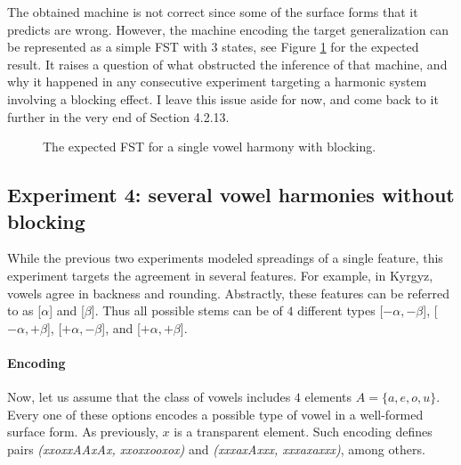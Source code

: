 The obtained machine is not correct since some of the surface forms that it predicts are wrong.
However, the machine encoding the target generalization can be represented as a simple FST with $3$ states, see Figure \ref{exp2fstrr} for the expected result.
It raises a question of what obstructed the inference of that machine, and why it happened in any consecutive experiment targeting a harmonic system involving a blocking effect.
I leave this issue aside for now, and come back to it further in the very end of Section 4.2.13.

\begin{figure}[h!] 
\centering
{}
\caption{The expected FST for a single vowel harmony with blocking.}
\label{exp2fstrr}
\end{figure}



\subsection{Experiment 4: several vowel harmonies without blocking}

While the previous two experiments modeled spreadings of a single feature, this experiment targets the agreement in several features.
For example, in Kyrgyz, vowels agree in backness and rounding.
Abstractly, these features can be referred to as [$\alpha$] and [$\beta$].
Thus all possible stems can be of $4$ different types [$-\alpha, -\beta$], [$-\alpha, +\beta$], [$+\alpha, -\beta$], and [$+\alpha, +\beta$].


\paragraph{Encoding}

Now, let us assume that the class of vowels includes $4$ elements $A = \{a, e, o, u\}$.
Every one of these options encodes a possible type of vowel in a well-formed surface form.
As previously, $x$ is a transparent element.
Such encoding defines pairs \emph{(xxoxxAAxAx, xxoxxooxox)} and \emph{(xxxaxAxxx, xxxaxaxxx)}, among others.






